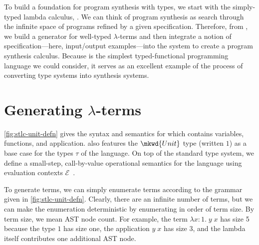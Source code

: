 
To build a foundation for program synthesis with types, we start with the simply-typed lambda calculus, \stlcu{}.
We can think of program synthesis as search through the infinite space of programs refined by a given specification.
Therefore, from \stlcu{}, we build a generator for well-typed $λ$-terms and then integrate a notion of specification---here, input/output examples---into the system to create a program synthesis calculus.
Because \stlcu{} is the simplest typed-functional programming language we could consider, it serves as an excellent example of the process of converting type systems into synthesis systems.



\section{Generating \texorpdfstring{$λ$}{λ}-terms}

\autoref{fig:stlc-unit-defn} gives the syntax and semantics for \stlcu{} which contains variables, functions, and application.
\stlcu{} also features the $\mkwd{Unit}$ type (written $1$) as a base case for the types $τ$ of the language.
On top of the standard type system, we define a small-step, call-by-value operational semantics for the language using evaluation contexts $ℰ$~.

To generate \stlcu{} terms, we can simply enumerate terms according to the grammar given in \autoref{fig:stlc-unit-defn}.
Clearly, there are an infinite number of terms, but we can make the enumeration deterministic by enumerating in order of term size.
By term size, we mean AST node count.  For example, the term $λx:1.\;y\;x$ has size 5 because the type $1$ has size one, the application $y\;x$ has size 3, and the lambda itself contributes one additional AST node.

